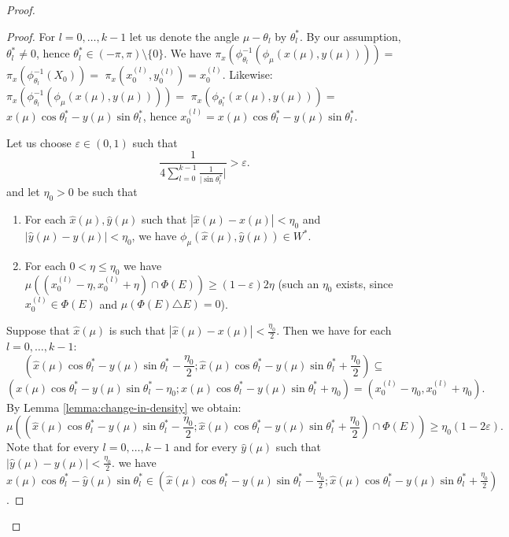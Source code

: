 \documentclass[12pt]{amsart}
\theoremstyle{plain}
\theoremstyle{definition}
\theoremstyle{remark}
\begin{document}
\begin{proof}
\begin{proof}
For $l = 0,\ldots, k-1$
let us denote the angle $\mu - \theta_l$ by $\theta^*_l$.
By our assumption, $\theta^*_l \not= 0$, hence
$\theta^*_l \in (-\pi, \pi) \setminus \lbrace 0 \rbrace$.
We have
$\pi_x(\phi_{\theta_l}^{-1}(\phi_{\mu}(x(\mu), y(\mu)))) =$
$ \pi_x(\phi_{\theta_l}^{-1}(X_0)) =$
$\pi_x(x^{(l)}_0, y^{(l)}_0) = x^{(l)}_0$.
Likewise:
$\pi_x(\phi_{\theta_l}^{-1}(\phi_{\mu}(x(\mu), y(\mu)))) =$
$\pi_x(\phi_{\theta^*_l}(x(\mu), y(\mu))) =$
$x(\mu) \cos \theta^*_l - y(\mu) \sin \theta^*_l$,
hence
$x_0^{(l)} = x(\mu) \cos \theta^*_l - y(\mu) \sin \theta^*_l$.

Let us choose $\varepsilon \in (0, 1)$ such that
\begin{equation}\label{equation:four-sinus}
  \frac{1}{4 \sum_{l=0}^{k-1} \frac{1}{|\sin \theta^*_l}|} > \varepsilon.
\end{equation}
and let $\eta_0 > 0$ be such that
\begin{enumerate}
\item  
For each $\hat{x}(\mu), \hat{y}(\mu)$ such that
$|\hat{x}(\mu) - x(\mu)| < \eta_0$ and
$|\hat{y}(\mu) - y(\mu)| < \eta_0$, we have
$\phi_{\mu}(\hat{x}(\mu), \hat{y}(\mu)) \in W^*$.
\item
  For each $0 < \eta \leq \eta_0$ we have
  $\mu((x^{(l)}_0 - \eta, x^{(l)}_0 + \eta) \cap \Phi(E)) \geq (1 - \varepsilon) 2 \eta$
  (such an $\eta_0$ exists, since $x^{(l)}_0\in \Phi(E)$ and $\mu(\Phi(E) \triangle E) = 0$).
\end{enumerate}

Suppose that $\hat{x}(\mu)$ is such that
$|\hat{x}(\mu) - x(\mu)| < \frac{\eta_0}{2}$.
Then we have for each $l = 0,\ldots,k-1$:
\[(\hat{x}(\mu) \cos \theta^*_l - y(\mu) \sin \theta^*_l - \frac{\eta_0}{2};
\hat{x}(\mu) \cos \theta^*_l - y(\mu) \sin \theta^*_l + \frac{\eta_0}{2})\subseteq\]
\[
(x(\mu) \cos \theta^*_l - y(\mu) \sin \theta^*_l - \eta_0;
x(\mu) \cos \theta^*_l - y(\mu) \sin \theta^*_l + \eta_0) =
(x_0^{(l)} - \eta_0, x_0^{(l)} + \eta_0).
\]
By Lemma \ref{lemma:change-in-density} we obtain:
\[\mu(
(\hat{x}(\mu) \cos \theta^*_l - y(\mu) \sin \theta^*_l - \frac{\eta_0}{2};
\hat{x}(\mu) \cos \theta^*_l - y(\mu) \sin \theta^*_l + \frac{\eta_0}{2})
\cap \Phi(E)) \geq \eta_0 (1 - 2 \varepsilon).
\]
Note that for every $l = 0, \ldots, k-1$
and for every $\hat{y}(\mu)$ such that $|\hat{y}(\mu) - y(\mu)| < \frac{\eta_0}{2}$.
we have
$
\hat{x}(\mu) \cos \theta^*_l - \hat{y}(\mu) \sin \theta^*_l \in
(\hat{x}(\mu) \cos \theta^*_l - y(\mu) \sin \theta^*_l - \frac{\eta_0}{2};
\hat{x}(\mu) \cos \theta^*_l - y(\mu) \sin \theta^*_l  + \frac{\eta_0}{2})
$.


\end{proof}
\end{proof}
\end{document}
